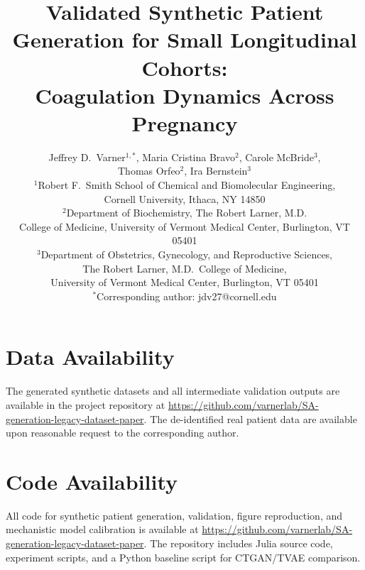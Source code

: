 \documentclass[11pt]{article}
\title{Validated Synthetic Patient Generation for Small Longitudinal Cohorts: \\
Coagulation Dynamics Across Pregnancy}
\author{
Jeffrey D.\ Varner$^{1,*}$,
Maria Cristina Bravo$^{2}$,
Carole McBride$^{3}$,
\\
Thomas Orfeo$^{2}$,
Ira Bernstein$^{3}$
\\[6pt]
{\small $^{1}$Robert F.\ Smith School of Chemical and Biomolecular Engineering,} \\
{\small Cornell University, Ithaca, NY 14850} \\
{\small $^{2}$Department of Biochemistry, The Robert Larner, M.D.} \\
{\small College of Medicine, University of Vermont Medical Center, Burlington, VT 05401} \\
{\small $^{3}$Department of Obstetrics, Gynecology, and Reproductive Sciences,} \\
{\small The Robert Larner, M.D.\ College of Medicine,} \\
{\small University of Vermont Medical Center, Burlington, VT 05401} \\[6pt]
{\small $^{*}$Corresponding author: jdv27@cornell.edu}
}
\date{}
\begin{document}
\maketitle

\begin{abstract}

\end{abstract}






\section*{Data Availability}
The generated synthetic datasets and all intermediate validation outputs
are available in the project repository at
\url{https://github.com/varnerlab/SA-generation-legacy-dataset-paper}.
The de-identified real patient data are available upon reasonable request to the
corresponding author.

\section*{Code Availability}
All code for synthetic patient generation, validation, figure reproduction,
and mechanistic model calibration is available at
\url{https://github.com/varnerlab/SA-generation-legacy-dataset-paper}.
The repository includes Julia source code, experiment scripts, and a Python
baseline script for CTGAN/TVAE comparison.






\clearpage

\end{document}
